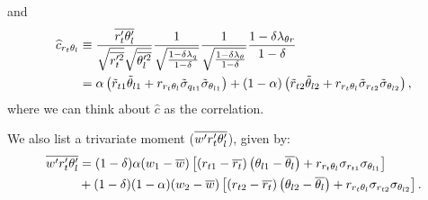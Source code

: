 and
\begin{align}
    \widehat{c}_{r_t \theta_l}
    &\equiv \frac{\overline{r_t' \theta_l'}}{\sqrt{\overline{r_t'^2}}\sqrt{\overline{\theta_l'^2}}}
    \frac{1}{\sqrt{\frac{1-\delta \lambda_q}{1-\delta}}}
    \frac{1}{\sqrt{\frac{1-\delta \lambda_\theta}{1-\delta}}}
    \frac{1 - \delta \lambda_{\theta r} }{1 - \delta} \nonumber\\
    &= \alpha \left(\tilde{r}_{t1} \tilde{\theta}_{l1} +
    r_{r_t \theta_l} \tilde{\sigma}_{q_{t1}} \tilde{\sigma}_{\theta_{l1}} \right) +
    (1 - \alpha) \left(\tilde{r}_{t2} \tilde{\theta}_{l2} +
    r_{r_t \theta_l} \tilde{\sigma}_{r_{t2}} \tilde{\sigma}_{\theta_{l2}} \right),
    \label{eq:c_hat_r_t_theta_l_nondim}
\end{align}
where we can think about $\widehat{c}$ as the correlation.

We also list a trivariate moment ($\overline{w' r_t' \theta_l'}$), given by:
\begin{align}
    \label{eq:w_prime_r_t_prime_t_l_prime_bar}
    \overline{w' r_t' \theta_l'}
    &= (1 - \delta) \alpha (w_1 - \overline{w}) \left[
        \left(r_{t1} - \overline{r_t}\right)
        \left(\theta_{l1} - \overline{\theta_l}\right) +
        r_{r_t \theta_l} \sigma_{r_{t1}} \sigma_{\theta_{l1}}
        \right] \nonumber\\
    &+ (1 - \delta) (1 - \alpha) (w_2 - \overline{w}) \left[
        \left(r_{t2} - \overline{r_t}\right)
        \left(\theta_{l2} - \overline{\theta_l}\right) +
        r_{r_t \theta_l} \sigma_{r_{t2}} \sigma_{\theta_{l2}}
        \right].
\end{align}